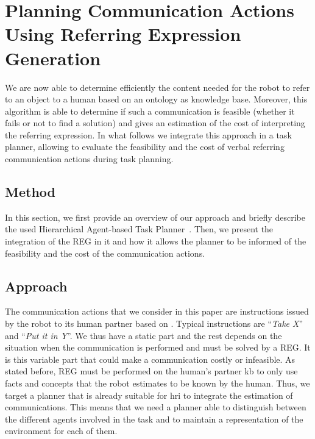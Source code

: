 \documentclass[a4paper,11pt,twoside]{StyleThese}
\begin{document}
\section[Using REG in Task Planning]{Planning Communication Actions Using Referring Expression Generation}

We are now able to determine efficiently the content needed for the robot to refer to an object to a human based on an ontology as knowledge base. Moreover, this algorithm is able to determine if such a communication is feasible (whether it fails or not to find a solution) and gives an estimation of the cost of interpreting the referring expression. In what follows we integrate this approach in a task planner, allowing to evaluate the feasibility and the cost of verbal referring communication actions during task planning.

\subsection{Method}
\label{sec:Integration}

In this section, we first provide an overview of our approach and briefly describe the used Hierarchical Agent-based Task Planner~\cite{lallement2014hatp}. Then, we present the integration of the REG in it and how it allows the planner to be informed of the feasibility and the cost of the communication actions.

\subsection{Approach}


The communication actions that we consider in this paper are instructions issued by the robot to its human partner based on . Typical instructions are ``\textit{Take X}'' and ``\textit{Put it in Y}''. We thus have a static part and the rest depends on the situation when the communication is performed and must be solved by a REG. It is this variable part that could make a communication costly or infeasible. As stated before, REG must be performed on the human's partner \acrfull{kb} to only use facts and concepts that the robot estimates to be known by the human. Thus, we target a planner that is already suitable for \acrshort{hri} to integrate the estimation of communications. This means that we need a planner able to distinguish between the different agents involved in the task and to maintain a representation of the environment for each of them.
\end{document}
